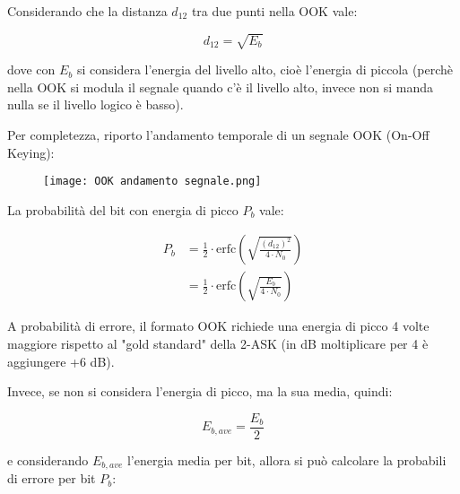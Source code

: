 Considerando che la distanza $d_{12}$ tra due punti nella OOK vale: 

{
    \Large 
    \begin{equation}
        d_{12} = \sqrt{E_b}
    \end{equation}
}

dove con $E_b$ si considera l'energia del livello alto, cioè l'energia di piccola (perchè nella OOK si modula il segnale quando c'è il livello alto, 
invece non si manda nulla se il livello logico è basso). \newline 

Per completezza, riporto l'andamento temporale di un segnale OOK (On-Off Keying): 

\begin{figure}[h]
    \centering
    \texttt{[image: OOK andamento segnale.png]}
\end{figure}

La probabilità del bit con energia di picco $P_b$ vale: 

{
    \Large 
    \begin{equation}
        \begin{split}
            P_b 
            &= 
            \frac{1}{2}
            \cdot 
            \text{erfc}
            \left(
                \sqrt{
                    \frac{(d_{12})^{2}}{4 \cdot N_0}
                }
            \right)
            \\
            &=
            \frac{1}{2}
            \cdot 
            \text{erfc}
            \left(
                \sqrt{
                    \frac{E_b}{4 \cdot N_0}
                }
            \right)
        \end{split}
    \end{equation}
}

A probabilità di errore, 
il formato OOK richiede una energia di picco 4 volte maggiore rispetto al "gold standard" della 2-ASK (in dB moltiplicare per 4 è aggiungere +6 dB). \newline 

Invece, se non si considera l'energia di picco, ma la sua media, quindi: 

{
    \Large 
    \begin{equation}
        E_{b, ave} = \frac{E_b}{2}
    \end{equation}
}

e considerando $E_{b, ave}$ l'energia media per bit, 
allora si può calcolare la probabili di errore per bit $P_b$: 

